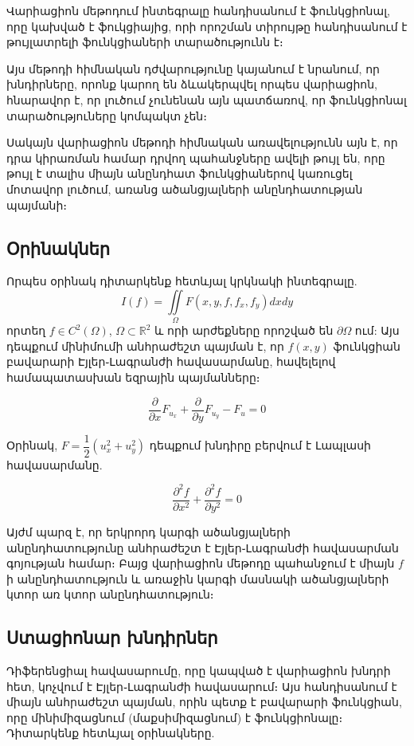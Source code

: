 \documentclass[fleqn, bachelor,subf,12pt,notitlepage]{article}
\begin{document}
Վարիացիոն մեթոդում ինտեգրալը հանդիսանում է ֆունկցիոնալ, որը կախված է ֆուկցիայից, որի որոշման տիրույթը հանդիսանում է թույլատրելի ֆունկցիաների  տարածությունն է։ 

Այս  մեթոդի հիմնական դժվարությունը կայանում է նրանում, որ խնդիրները, որոնք կարող են ձևակերպվել որպես վարիացիոն, հնարավոր է, որ լուծում չունենան այն պատճառով, որ ֆունկցիոնալ տարածություները  կոմպակտ չեն։

Սակայն վարիացիոն մեթոդի հիմնական առավելությունն այն է, որ դրա կիրառման համար դրվող պահանջները ավելի թույլ են, որը թույլ է տալիս միայն անընդհատ \newpage ֆունկցիաներով կառուցել մոտավոր լուծում, առանց ածանցյալների անընդհատության պայմանի։
\newpage
\subsection*{Օրինակներ}
\hspace{\parindent}Որպես օրինակ դիտարկենք հետևյալ կրկնակի ինտեգրալը.
$$I\left(f\right)=\iint \limits_{\Omega} F\left(x, y, f, f_{x}, f_{y}\right)dxdy$$
որտեղ $f \in C^{2}(\Omega)$,  $\Omega\subset \mathbb{R}^{2}$ և որի արժեքները որոշված են $\partial \Omega$ ում:
Այս դեպքում մինիմումի անհրաժեշտ պայման է, որ $f(x,y)$ ֆունկցիան բավարարի Էյլեր֊Լագրանժի հավասարմանը, հավելելով համապատասխան եզրային պայմանները։

$$\dfrac{\partial}{\partial x}F_{u_{x}} + \dfrac{\partial}{\partial y}F_{u_{y}} - F_{u} = 0$$

\noindent Օրինակ, $F = \dfrac{1}{2}\left(u_{x}^2+u_{y}^2\right)$ դեպքում խնդիրը բերվում է Լապլասի հավասարմանը.

$$\dfrac{\partial^{2}f}{\partial x^{2}} + \dfrac{\partial^{2}f}{\partial y^{2}} = 0$$


Այժմ պարզ է, որ երկրորդ կարգի ածանցյալների անընդհատությունը անհրաժեշտ է Էյլեր֊Լագրանժի հավասարման գոյության համար։ Բայց վարիացիոն մեթոդը պահանջում է միայն $f$ ի անընդհատություն և առաջին կարգի մասնակի ածանցյալների կտոր առ կտոր անընդհատություն։

\subsection*{Ստացիոնար խնդիրներ} %

Դիֆերենցիալ հավասարումը, որը կապված է վարիացիոն խնդրի հետ, կոչվում է Էյլեր֊Լագրանժի հավասարում։ Այս հանդիսանում է միայն անհրաժեշտ պայման, որին պետք է բավարարի ֆունկցիան, որը մինիմիզացնում (մաքսիմիզացնում) է ֆունկցիոնալը։ 
Դիտարկենք հետևյալ օրինակները.
\end{document}
